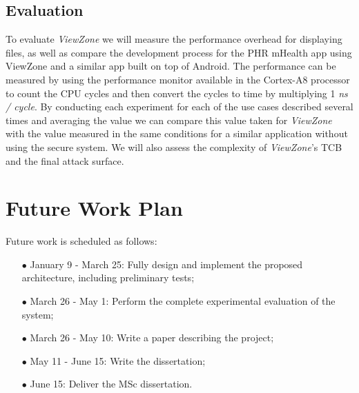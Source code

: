 \subsection{Evaluation}

To evaluate \emph{ViewZone} we will measure the performance overhead for displaying files, as well as compare the development process for the PHR mHealth app using ViewZone and a similar app built on top of Android. The performance can be measured by using the performance monitor available in the Cortex-A8 processor to count the CPU cycles and then convert the cycles to time by multiplying 1 \emph{ns / cycle}. By conducting each experiment for each of the use cases described several times and averaging the value we can compare this value taken for \emph{ViewZone} with the value measured in the same conditions for a similar application without using the secure system. We will also assess the complexity of \emph{ViewZone}'s TCB and the final attack surface.

\section{Future Work Plan}
\label{sec:workplan}

Future work is scheduled as follows:

\begin{itemize}
	\item[$\bullet$] January 9 - March 25: Fully design and implement the proposed architecture, including preliminary tests;
	\item[$\bullet$] March 26 - May 1: Perform the complete experimental evaluation 	of the system;
	\item[$\bullet$] March 26 - May 10: Write a paper describing the project;
	\item[$\bullet$] May 11 - June 15: Write the dissertation;
	\item[$\bullet$] June 15: Deliver the MSc dissertation.
\end{itemize}